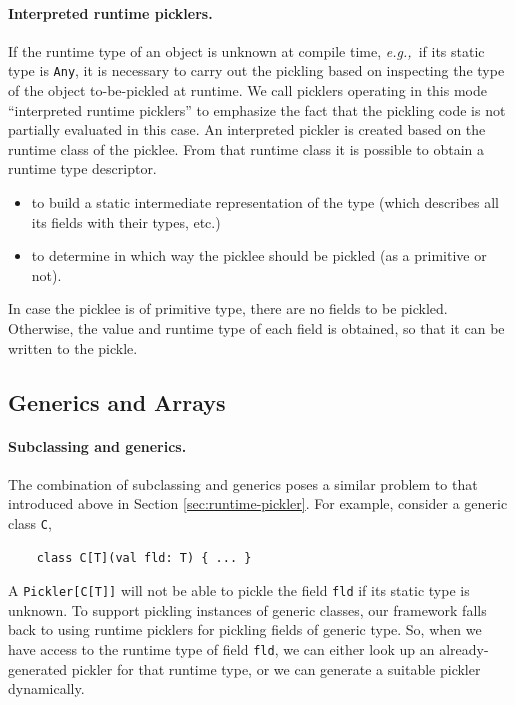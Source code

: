 \documentclass[10pt]{sigplanconf}
\theoremstyle{definition}
\theoremstyle{definition}
\newcommand{\todo}{{\bf \colorbox{red}{\color{white}TODO:}}}
\newcommand{\eg}{{\em e.g.,~}}
\newcommand{\term}[1]{\mbox{\texttt{#1}}}
\begin{document}
\paragraph{Interpreted runtime picklers.} If the runtime type of an object is
unknown at compile time, \eg if its static type is \term{Any}, it is
necessary to carry out the pickling based on inspecting the type of the object
to-be-pickled at runtime. We call picklers operating in this mode ``interpreted
runtime picklers'' to emphasize the fact that the pickling code is not
partially evaluated in this case. An interpreted pickler is created based on
the runtime class of the picklee. From that runtime class it is possible to
obtain a runtime type descriptor.

\begin{itemize}
\item to build a static intermediate representation of the type (which describes all its fields with their types, etc.)
\item to determine in which way the picklee should be pickled (as a primitive or not).
\end{itemize}

In case the picklee is of primitive type, there are no fields to be pickled.
Otherwise, the value and runtime type of each field is obtained, so that it
can be written to the pickle.


\subsection{Generics and Arrays}

\paragraph{Subclassing and generics.} The combination of subclassing and generics
poses a similar problem to that introduced above in Section \ref{sec:runtime-pickler}.
For example, consider a generic class \term{C},

\begin{lstlisting}
    class C[T](val fld: T) { ... }
\end{lstlisting}

A \term{Pickler[C[T]]} will not be able to pickle the field \term{fld} if its
static type is unknown. To support pickling instances of generic classes, our
framework falls back to using runtime picklers for pickling fields of generic
type. So, when we have access to the runtime type of field \term{fld}, we can
either look up an already-generated pickler for that runtime type, or we can
generate a suitable pickler dynamically.
\end{document}

